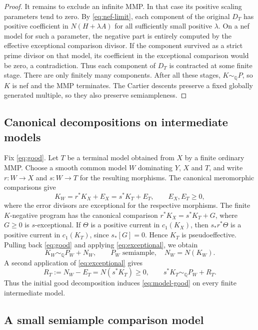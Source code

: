 \documentclass[11pt,a4paper]{article}
\theoremstyle{definition}\newtheorem{definition}[theorem]{Definition}
\theoremstyle{remark}\newtheorem*{remark}{Remark}
\newcommand{\Q}{\mathbb Q}\newcommand{\C}{\mathbb C}
\begin{document}
\begin{proof}
It remains to exclude an infinite MMP. In that case its positive scaling
parameters tend to zero. By \eqref{eq:nef-limit}, each component of the original
$D_T$ has positive coefficient in $N(H+\lambda A)$ for all sufficiently small
positive $\lambda$. On a nef model for such a parameter, the negative part is
entirely computed by the effective exceptional comparison divisor. If the
component survived as a strict prime divisor on that model, its coefficient
in the exceptional comparison would be zero, a contradiction. Thus each
component of $D_T$ is contracted at some finite stage. There are only finitely
many components. After all these stages, $K\sim_\Q P$, so $K$ is nef
and the MMP terminates. The Cartier descents preserve a fixed globally generated multiple,
so they also preserve semiampleness.
\end{proof}

\subsection{Canonical decompositions on intermediate models}

Fix \eqref{eq:good}. Let $T$ be a terminal model obtained from $X$ by a finite
ordinary MMP. Choose a smooth common model $W$ dominating $Y$, $X$ and $T$,
and write $r:W\to X$ and $s:W\to T$ for the resulting morphisms.
The canonical meromorphic comparisons give
\[
 K_W=r^*K_X+E_X=s^*K_T+E_T,
 \qquad E_X,E_T\ge0,
\]
where the error divisors are exceptional for the respective morphisms.
The finite $K$-negative program has the canonical comparison
$r^*K_X=s^*K_T+G$, where $G\ge0$ is $s$-exceptional.
If $\Theta$ is a positive current in $c_1(K_X)$, then $s_*r^*\Theta$
is a positive current in $c_1(K_T)$, since $s_*[G]=0$.
Hence $K_T$ is pseudoeffective. Pulling back \eqref{eq:good} and applying
\eqref{eq:exceptional}, we obtain
\[
 K_W\sim_\Q P_W+N_W,
 \qquad P_W\text{ semiample},\quad N_W=N(K_W).
\]
A second application of \eqref{eq:exceptional} gives
\begin{equation}\label{eq:model-good}
 R_T:=N_W-E_T=N(s^*K_T)\ge0,
 \qquad s^*K_T\sim_\Q P_W+R_T.
\end{equation}
Thus the initial good decomposition induces \eqref{eq:model-good} on every
finite intermediate model.

\subsection{A small semiample comparison model}
\end{document}
